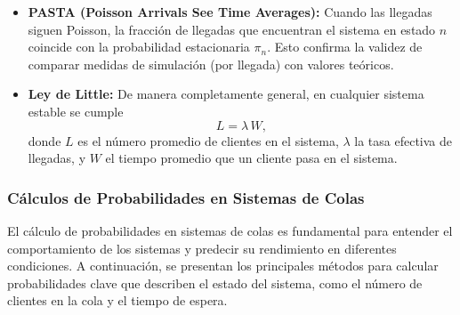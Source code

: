 \documentclass{article}
\begin{document}
\begin{itemize}
    \item \textbf{PASTA (Poisson Arrivals See Time Averages):}  
    Cuando las llegadas siguen Poisson, la fracción de llegadas que encuentran el sistema en estado \(n\) coincide con la probabilidad estacionaria \(\pi_n\). Esto confirma la validez de comparar medidas de simulación (por llegada) con valores teóricos.
    
    \item \textbf{Ley de Little:}  
    De manera completamente general, en cualquier sistema estable se cumple
    \[
      L = \lambda \, W,
    \]
    donde \(L\) es el número promedio de clientes en el sistema, \(\lambda\) la tasa efectiva de llegadas, y \(W\) el tiempo promedio que un cliente pasa en el sistema.
\end{itemize}


\subsubsection{Cálculos de Probabilidades en Sistemas de Colas}
El cálculo de probabilidades en sistemas de colas es fundamental para entender el comportamiento de los sistemas y predecir su rendimiento en diferentes condiciones. A continuación, se presentan los principales métodos para calcular probabilidades clave que describen el estado del sistema, como el número de clientes en la cola y el tiempo de espera.
\end{document}
